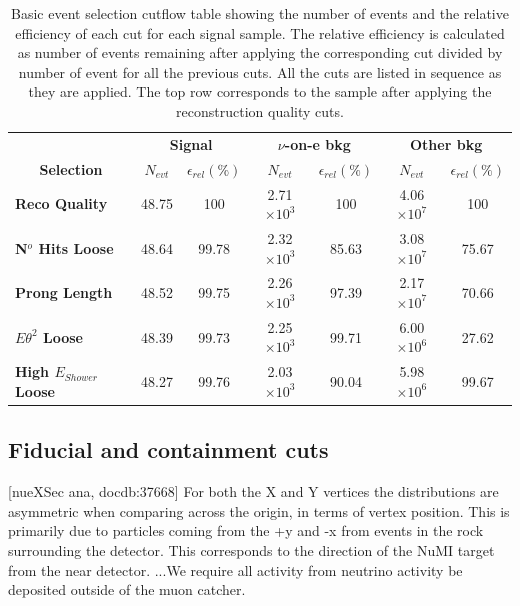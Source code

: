 
\begin{table}[!hb]
\centering
\caption[Event selection cutflow table for the basic event selection]{Basic event selection cutflow table showing the number of events and the relative efficiency of each cut for each signal sample. The relative efficiency is calculated as number of events remaining after applying the corresponding cut divided by number of event for all the previous cuts. All the cuts are listed in sequence as they are applied. The top row corresponds to the sample after applying the reconstruction quality cuts.}
\begin{tabular}{|l|cc|cc|cc|}\hline
\multicolumn{1}{|c|}{} & \multicolumn{2}{c|}{\textbf{Signal}} & \multicolumn{2}{c|}{\textbf{$\nu$-on-e bkg}} & \multicolumn{2}{c|}{\textbf{Other bkg}} \\
\multicolumn{1}{|c|}{\multirow{-2}{*}{\textbf{Selection}}} & \textbf{$N_{evt}$} & \textbf{$\epsilon_{rel}\left(\%\right)$} & \textbf{$N_{evt}$} & \textbf{$\epsilon_{rel}\left(\%\right)$}  & \textbf{$N_{evt}$} & \textbf{$\epsilon_{rel}\left(\%\right)$}\\\hline
\textbf{Reco Quality} & 48.75 & 100 & 2.71$\times 10^3$ & 100 & 4.06$\times 10^7$ & 100\\
\textbf{N$^o$ Hits Loose} & 48.64 & 99.78 & 2.32$\times 10^3$ & 85.63 & 3.08$\times 10^7$ & 75.67\\
\textbf{Prong Length} & 48.52 & 99.75 & 2.26$\times 10^3$ & 97.39 & 2.17$\times 10^7$ & 70.66\\
\textbf{$E\theta^2$ Loose} & 48.39 & 99.73 & 2.25$\times 10^3$ & 99.71 & 6.00$\times 10^6$ & 27.62\\
\textbf{High $E_{Shower}$ Loose} & 48.27 & 99.76 & 2.03$\times 10^3$ & 90.04 & 5.98$\times 10^6$ & 99.67\\\hline
\end{tabular}
\label{tab:CutflowTableBasicSelection}
\end{table}

\subsection{Fiducial and containment cuts}

[nueXSec ana, docdb:37668] For both the X and Y vertices the distributions are asymmetric when comparing across the origin, in terms of vertex position. This is primarily due to particles coming from the +y and -x from events in the rock surrounding the detector. This corresponds to the direction of the NuMI target from the near detector. ...We require all activity from neutrino activity be deposited outside of the muon catcher.

